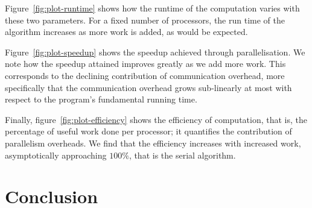 \documentclass[11pt,twocolumn]{article} %
\begin{document}
Figure~\ref{fig:plot-runtime} shows how the runtime of the computation varies with these two parameters. For a fixed number of processors, the run time of the algorithm increases as more work is added, as would be expected.

Figure~\ref{fig:plot-speedup} shows the speedup achieved through parallelisation. We note how the speedup attained improves greatly as we add more work. This corresponds to the declining contribution of communication overhead, more specifically that the communication overhead grows sub-linearly at most with respect to the program's fundamental running time.

Finally, figure~\ref{fig:plot-efficiency} shows the efficiency of computation, that is, the percentage of useful work done per processor; it quantifies the contribution of parallelism overheads. We find that the efficiency increases with increased work, asymptotically approaching $100\%$, that is the serial algorithm.



\section{Conclusion}

\end{document}
